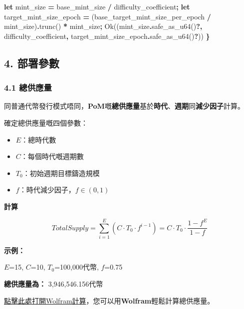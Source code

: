 \documentclass[
]{article}
\newenvironment{Shaded}{\begin{snugshade}}{\end{snugshade}}
\newcommand{\ConstantTok}[1]{\textcolor[rgb]{0.56,0.35,0.01}{#1}}
\newcommand{\KeywordTok}[1]{\textcolor[rgb]{0.13,0.29,0.53}{\textbf{#1}}}
\newcommand{\NormalTok}[1]{#1}
\newcommand{\OperatorTok}[1]{\textcolor[rgb]{0.81,0.36,0.00}{\textbf{#1}}}
\providecommand{\tightlist}{%
  \setlength{\itemsep}{0pt}\setlength{\parskip}{0pt}}
\begin{document}
\begin{Shaded}
\begin{Highlighting}[numbers=left,,]
  \KeywordTok{let}\NormalTok{ mint\_size }\OperatorTok{=}\NormalTok{  base\_mint\_size }\OperatorTok{/}\NormalTok{ difficulty\_coefficient}\OperatorTok{;}
  \KeywordTok{let}\NormalTok{ target\_mint\_size\_epoch }\OperatorTok{=}\NormalTok{ (base\_target\_mint\_size\_per\_epoch }\OperatorTok{/}\NormalTok{ mint\_size)}\OperatorTok{.}\NormalTok{trunc() }
  \OperatorTok{*}\NormalTok{ mint\_size}\OperatorTok{;}
  \ConstantTok{Ok}\NormalTok{((mint\_size}\OperatorTok{.}\NormalTok{safe\_as\_u64()}\OperatorTok{?,}\NormalTok{ difficulty\_coefficient}\OperatorTok{,}\NormalTok{ target\_mint\_size\_epoch}\OperatorTok{.}\NormalTok{safe\_as\_u64()}\OperatorTok{?}\NormalTok{))}
\OperatorTok{\}}
\end{Highlighting}
\end{Shaded}

\subsection{4. 部署參數}\label{ux90e8ux7f72ux53c3ux6578}

\subsubsection{4.1 總供應量}\label{ux7e3dux4f9bux61c9ux91cf}

同普通代幣發行模式唔同，\textbf{PoM}嘅\textbf{總供應量}基於\textbf{時代}、\textbf{週期}同\textbf{減少因子}計算。

確定總供應量嘅四個參數：

\begin{itemize}
\tightlist
\item
  \(E\)：總時代數
\item
  \(C\)：每個時代嘅週期數
\item
  \(T_0\)：初始週期目標鑄造規模
\item
  \(f\)：時代減少因子，\(f \in (0,1)\)
\end{itemize}

\textbf{計算}

\begin{equation}
TotalSupply = \sum_{i=1}^{E}(C \cdot T_0 \cdot f^{i-1})=C \cdot T_0 \cdot \frac{1-f^E}{1-f}
\end{equation}

\textbf{示例：}

\(E\)=15, \(C\)=10, \(T_0\)=100,000代幣, \(f\)=0.75

\textbf{總供應量為：} 3,946,546.156代幣

\href{https://www.wolframalpha.com/input?i=sum+10*100000*0.75\%5E\%28i-1\%29\%2C+i+\%3D+1+to+15}{點擊此處打開Wolfram計算}，您可以用\textbf{Wolfram}輕鬆計算總供應量。
\end{document}
